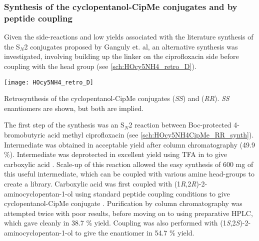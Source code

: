 \subsubsection{Synthesis of the cyclopentanol-CipMe conjugates   and  by peptide coupling\label{sec:CipMe_linker}}

Given the side-reactions and low yields associated with the literature synthesis of the S$_N$2 conjugates proposed by Ganguly et. al\cite{Ganguly2011}, an alternative synthesis was investigated, involving building up the linker on the ciprofloxacin side before coupling with the head group (see \ref{sch:HOcy5NH4_retro_D}).


\begin{scheme}[H]
	\begin{center}
		\texttt{[image: HOcy5NH4\_retro\_D]}
		\caption{Retrosynthesis of the cyclopentanol-CipMe conjugates   (\textit{SS}) and  (\textit{RR}). \textit{SS} enantiomers are shown, but both are implied.\label{sch:HOcy5NH4_retro_D}}
	\end{center}
\end{scheme}

The first step of the synthesis was an S$_N$2 reaction between Boc-protected 4-bromobutyric acid  methyl ciprofloxacin  (see \ref{sch:HOcy5NH4CipMe_RR_synth}). Intermediate  was obtained in acceptable yield after column chromatography (49.9 \%).
Intermediate  was deprotected in excellent yield using TFA in  to give carboxylic acid . Scale-up of this reaction allowed the easy synthesis of 600 mg of this useful intermediate, which can be coupled with various amine head-groups to create a library.
Carboxylic acid  was first coupled with (1\textit{R},2\textit{R})-2-aminocyclopentan-1-ol  using standard peptide coupling conditions to give cyclopentanol-CipMe conjugate . Purification by column chromatography was attempted twice with poor results, before moving on to using preparative HPLC, which gave  cleanly in 38.7 \% yield.
Coupling was also performed with (1\textit{S},2\textit{S})-2-aminocyclopentan-1-ol  to give the enantiomer  in 54.7 \% yield.



